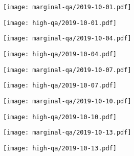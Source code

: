 \documentclass{article}
\begin{document}
\begin{figure}[H]
	\ContinuedFloat
	\centering
	\begin{subfigure}{0.48\linewidth}
		\texttt{[image: marginal-qa/2019-10-01.pdf]}
	\end{subfigure}
	\begin{subfigure}{0.48\linewidth}
		\texttt{[image: high-qa/2019-10-01.pdf]}
	\end{subfigure}
	\begin{subfigure}{0.48\linewidth}
		\texttt{[image: marginal-qa/2019-10-04.pdf]}
	\end{subfigure}
	\begin{subfigure}{0.48\linewidth}
		\texttt{[image: high-qa/2019-10-04.pdf]}
	\end{subfigure}
	\begin{subfigure}{0.48\linewidth}
		\texttt{[image: marginal-qa/2019-10-07.pdf]}
	\end{subfigure}
	\begin{subfigure}{0.48\linewidth}
		\texttt{[image: high-qa/2019-10-07.pdf]}
	\end{subfigure}
	\begin{subfigure}{0.48\linewidth}
		\texttt{[image: marginal-qa/2019-10-10.pdf]}
	\end{subfigure}
	\begin{subfigure}{0.48\linewidth}
		\texttt{[image: high-qa/2019-10-10.pdf]}
	\end{subfigure}
	\begin{subfigure}{0.48\linewidth}
		\texttt{[image: marginal-qa/2019-10-13.pdf]}
	\end{subfigure}
	\begin{subfigure}{0.48\linewidth}
		\texttt{[image: high-qa/2019-10-13.pdf]}
	\end{subfigure}
\end{figure}
\end{document}
